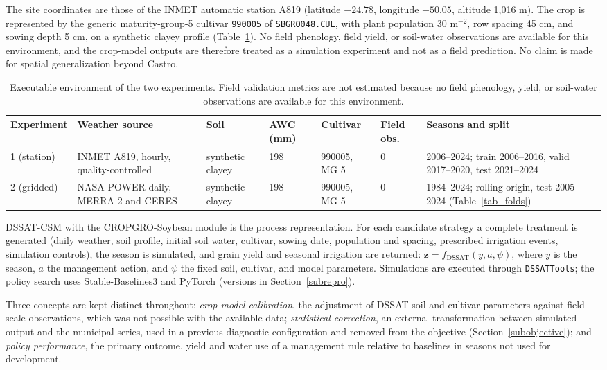 \documentclass[times,final,authoryear]{elsarticle}
\begin{document}
The site coordinates are those of the INMET automatic station A819 (latitude $-24.78$, longitude $-50.05$, altitude 1,016 m). The crop is represented by the generic maturity-group-5 cultivar \texttt{990005} of \texttt{SBGRO048.CUL}, with plant population 30 m$^{-2}$, row spacing 45 cm, and sowing depth 5 cm, on a synthetic clayey profile (Table~\ref{tab_environment_a_current}). No field phenology, field yield, or soil-water observations are available for this environment, and the crop-model outputs are therefore treated as a simulation experiment and not as a field prediction. No claim is made for spatial generalization beyond Castro.

\begin{table}[!h]
\centering
\scriptsize
\caption{Executable environment of the two experiments. Field validation metrics are not estimated because no field phenology, yield, or soil-water observations are available for this environment.}
\label{tab_environment_a_current}
\begin{tabular}{p{2.3cm}p{2.6cm}p{1.6cm}p{1.0cm}p{1.4cm}p{1.1cm}p{3.6cm}}
\hline
Experiment & Weather source & Soil & AWC (mm) & Cultivar & Field obs. & Seasons and split \\
\hline
1 (station) & INMET A819, hourly, quality-controlled & synthetic clayey & 198 & 990005, MG 5 & 0 & 2006--2024; train 2006--2016, valid 2017--2020, test 2021--2024 \\
2 (gridded) & NASA POWER daily, MERRA-2 and CERES & synthetic clayey & 198 & 990005, MG 5 & 0 & 1984--2024; rolling origin, test 2005--2024 (Table~\ref{tab_folds}) \\
\hline
\end{tabular}
\end{table}

DSSAT-CSM with the CROPGRO-Soybean module is the process representation. For each candidate strategy a complete treatment is generated (daily weather, soil profile, initial soil water, cultivar, sowing date, population and spacing, prescribed irrigation events, simulation controls), the season is simulated, and grain yield and seasonal irrigation are returned: $\mathbf{z} = f_{\text{DSSAT}}(y,a,\psi)$, where $y$ is the season, $a$ the management action, and $\psi$ the fixed soil, cultivar, and model parameters. Simulations are executed through \texttt{DSSATTools}; the policy search uses Stable-Baselines3 and PyTorch (versions in Section~\ref{subrepro}).

Three concepts are kept distinct throughout: \emph{crop-model calibration}, the adjustment of DSSAT soil and cultivar parameters against field-scale observations, which was not possible with the available data; \emph{statistical correction}, an external transformation between simulated output and the municipal series, used in a previous diagnostic configuration and removed from the objective (Section~\ref{subobjective}); and \emph{policy performance}, the primary outcome, yield and water use of a management rule relative to baselines in seasons not used for development.
\end{document}
